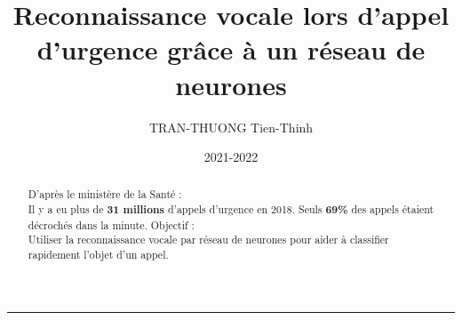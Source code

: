 \documentclass[12pt]{article}
\author{TRAN-THUONG Tien-Thinh}
\title{Reconnaissance vocale lors d’appel d’urgence grâce à un réseau de neurones}
\date{2021-2022}
\begin{document}
\maketitle
\begin{abstract}
    D'après le ministère de la Santé : \\
    Il y a eu plus de \textbf{31 millions} d'appels d'urgence en 2018. Seuls \textbf{69\%} des appels étaient décrochés dans la minute. \break
    \indent Objectif :\\
    Utiliser la reconnaissance vocale par réseau de neurones pour aider à classifier rapidement l'objet d'un appel.
\end{abstract}
\rule{\linewidth}{.5pt}







\end{document}
